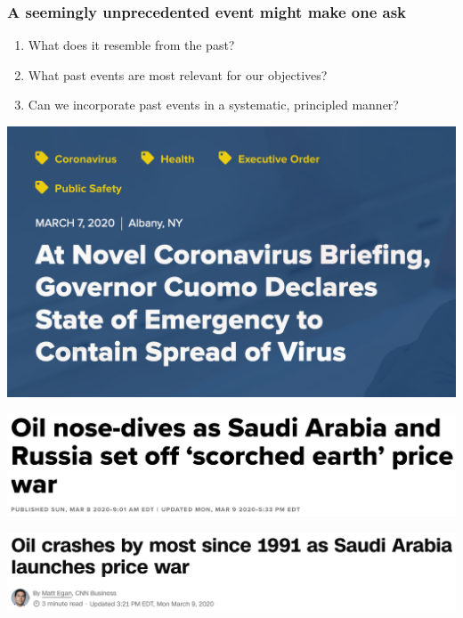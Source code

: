 \documentclass[9pt]{beamer}
\theoremstyle{definition}
\begin{document}
\begin{frame}
\frametitle{A seemingly unprecedented event might make one ask}
\begin{enumerate}
    \item <1-> What does it resemble from the past?
    \item <2-> What past events are most relevant for our objectives?
    \item <3-> Can we incorporate past events in a systematic, principled manner?
\end{enumerate}
\end{frame}

\begin{frame}

    \begin{example}
        \href{https://www.governor.ny.gov/news/novel-coronavirus-briefing-governor-cuomo-declares-state-emergency-contain-spread-virus}{\includegraphics[scale=.3]{NYS_state.png}}

        \href{https://www.cnbc.com/2020/03/08/opec-deal-collapse-sparks-price-war-20-oil-in-2020-is-coming.html}{\includegraphics[scale=.3]{cnn.png}}

        \href{https://www.cnn.com/2020/03/08/investing/oil-prices-crash-opec-russia-saudi-arabia/index.html}{\includegraphics[scale=.3]{cnbc.png}}
        \end{example}

\end{frame}
\end{document}
